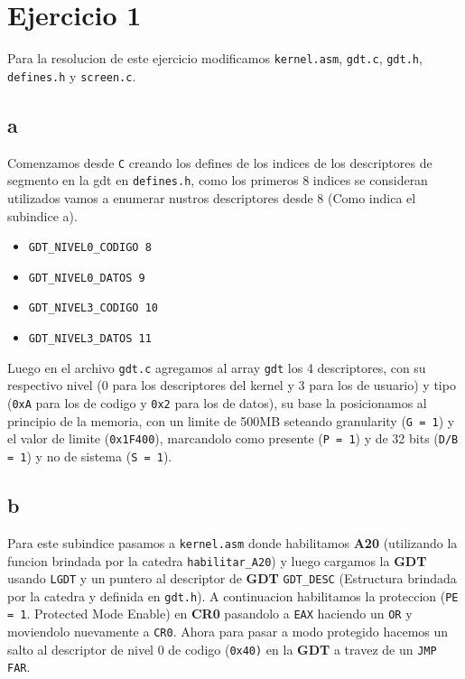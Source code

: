 \section{Ejercicio 1}

Para la resolucion de este ejercicio modificamos \texttt{kernel.asm}, \texttt{gdt.c}, \texttt{gdt.h}, \texttt{defines.h} y \texttt{screen.c}.

\subsection{a}
Comenzamos desde \texttt{C} creando los defines de los indices de los descriptores de segmento en la gdt en \texttt{defines.h}, como los primeros 8 indices se consideran utilizados vamos a enumerar nustros descriptores desde 8 (Como indica el subindice a).

\begin{itemize}
\item \texttt{GDT\_NIVEL0\_CODIGO   8}
\item \texttt{GDT\_NIVEL0\_DATOS    9}
\item \texttt{GDT\_NIVEL3\_CODIGO   10}
\item \texttt{GDT\_NIVEL3\_DATOS    11}
\end{itemize}

Luego en el archivo \texttt{gdt.c} agregamos al array \texttt{gdt} los 4 descriptores, con su respectivo nivel (0 para los descriptores del kernel y 3 para los de usuario) y tipo (\texttt{0xA} para los de codigo y \texttt{0x2} para los de datos), su base la posicionamos al principio de la memoria, con un limite de 500MB seteando granularity (\texttt{G = 1}) y el valor de limite (\texttt{0x1F400}), marcandolo como presente (\texttt{P = 1}) y de 32 bits (\texttt{D/B = 1}) y no de sistema (\texttt{S = 1}).

\subsection{b}
Para este subindice pasamos a \texttt{kernel.asm} donde habilitamos \textbf{A20} (utilizando la funcion brindada por la catedra \texttt{habilitar\_A20}) y luego cargamos la \textbf{GDT} usando \texttt{LGDT} y un puntero al descriptor de \textbf{GDT} \texttt{GDT\_DESC} (Estructura brindada por la catedra y definida en \texttt{gdt.h}). A continuacion habilitamos la proteccion (\texttt{PE = 1}. Protected Mode Enable) en \textbf{CR0} pasandolo a \texttt{EAX} haciendo un \texttt{OR} y moviendolo nuevamente a \texttt{CR0}. Ahora para pasar a modo protegido hacemos un salto al descriptor de nivel 0 de codigo (\texttt{0x40)} en la \textbf{GDT} a travez de un \texttt{JMP FAR}. \\

